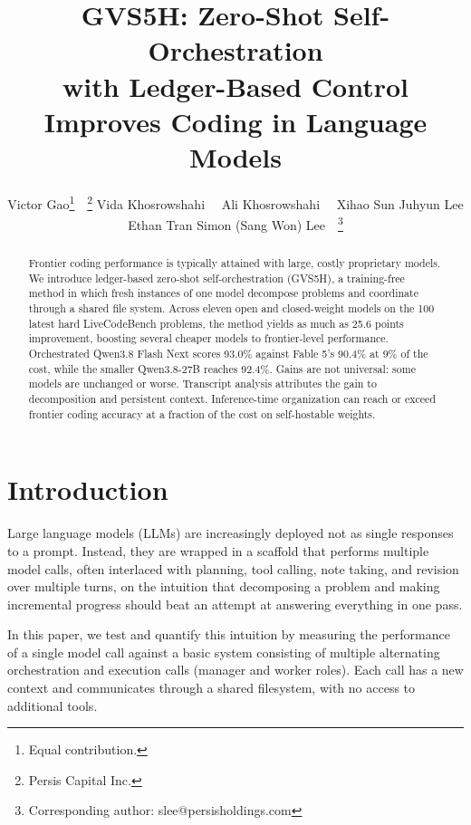 \documentclass{article}
\title{GVS5H: Zero-Shot Self-Orchestration \\
with Ledger-Based Control \\
Improves Coding in Language Models}
\author{%
  Victor Gao\thanks{Equal contribution.}\ \ \thanks{Persis Capital Inc.} \quad
  Vida Khosrowshahi\footnotemark[1]\ \ \footnotemark[2] \quad
  Ali Khosrowshahi\footnotemark[1]\ \ \footnotemark[2] \AND
  Xihao Sun\footnotemark[2] \quad
  Juhyun Lee \quad
  Ethan Tran\footnotemark[2] \quad
  Simon (Sang Won) Lee\footnotemark[2]\ \ \thanks{Corresponding author:
  slee@persisholdings.com}
}
\begin{document}
\maketitle

\lhead{}

\begin{abstract}
Frontier coding performance is typically attained with large, costly proprietary models. We introduce ledger-based zero-shot self-orchestration (GVS5H), a training-free method in which fresh instances of one model decompose problems and coordinate through a shared file system. 
Across eleven open and closed-weight models on the 100 latest hard LiveCodeBench problems,
the method yields as much as 25.6 points improvement, boosting several cheaper models to frontier-level performance. 
Orchestrated Qwen3.8 Flash Next scores 93.0\% against Fable 5's 90.4\% at 9\% of the cost, while the smaller Qwen3.8-27B reaches 92.4\%. 
Gains are not universal: some models are unchanged or worse. Transcript analysis attributes the gain to decomposition and persistent context. 
Inference-time organization can reach or exceed frontier coding accuracy at a fraction of the cost on self-hostable weights.
\end{abstract}

\section{Introduction}
\label{sec:intro}

Large language models (LLMs) are increasingly deployed not as single responses to a prompt. Instead, they are wrapped in a scaffold that performs multiple model calls, often interlaced with planning, tool calling, note taking,
and revision over multiple turns, on the intuition that decomposing a problem and making incremental progress should beat an attempt at answering everything in one pass.

In this paper, we test and quantify this intuition by measuring the performance of a single model call against a basic system consisting of multiple alternating orchestration and execution calls (manager and worker roles). Each call has a new context and communicates through a shared filesystem, with no access to additional tools.
 
\end{document}
